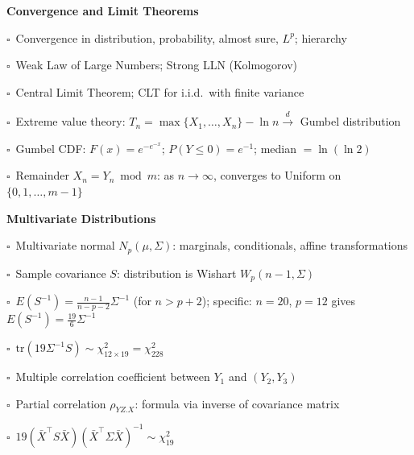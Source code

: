\documentclass[11pt,a4paper]{article}
\newcommand{\chk}{\textcolor{rulegray}{$\square$}\ }
\begin{document}
\begin{subtopics}
  \item \textbf{Convergence and Limit Theorems}
  \begin{subtopics}
    \item \chk Convergence in distribution, probability, almost sure, $L^p$; hierarchy
    \item \chk Weak Law of Large Numbers; Strong LLN (Kolmogorov)
    \item \chk Central Limit Theorem; CLT for i.i.d.\ with finite variance
    \item \chk Extreme value theory: $T_n=\max\{X_1,\ldots,X_n\}-\ln n \xrightarrow{d}$ Gumbel distribution
    \item \chk Gumbel CDF: $F(x)=e^{-e^{-x}}$; $P(Y\le 0)=e^{-1}$; median $=\ln(\ln 2)$
    \item \chk Remainder $X_n = Y_n \bmod m$: as $n\to\infty$, converges to Uniform on $\{0,1,\ldots,m-1\}$
  \end{subtopics}

  \item \textbf{Multivariate Distributions}
  \begin{subtopics}
    \item \chk Multivariate normal $N_p(\mu,\Sigma)$: marginals, conditionals, affine transformations
    \item \chk Sample covariance $S$: distribution is Wishart $W_p(n-1, \Sigma)$
    \item \chk $E(S^{-1})=\frac{n-1}{n-p-2}\Sigma^{-1}$ (for $n>p+2$); specific: $n=20$, $p=12$ gives $E(S^{-1})=\frac{19}{6}\Sigma^{-1}$
    \item \chk $\mathrm{tr}(19\Sigma^{-1}S)\sim\chi^2_{12\times 19}=\chi^2_{228}$
    \item \chk Multiple correlation coefficient between $Y_1$ and $(Y_2,Y_3)$
    \item \chk Partial correlation $\rho_{YZ.X}$: formula via inverse of covariance matrix
    \item \chk $19(\bar X^\top S\bar X)(\bar X^\top\Sigma\bar X)^{-1}\sim\chi^2_{19}$
  \end{subtopics}


\end{subtopics}
\end{document}
